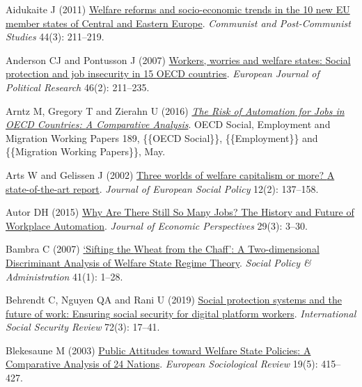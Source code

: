 \documentclass[
  12pt,
]{article}
\newlength{\cslhangindent}
\newenvironment{CSLReferences}[2] %
 {\begin{list}{}{%
  \setlength{\itemindent}{0pt}
  \setlength{\leftmargin}{0pt}
  \setlength{\parsep}{0pt}
  \ifodd #1
   \setlength{\leftmargin}{\cslhangindent}
   \setlength{\itemindent}{-1\cslhangindent}
  \fi
  \setlength{\itemsep}{#2\baselineskip}}}
 {\end{list}}
\begin{document}
\protect{}\label{refs}
\begin{CSLReferences}{1}{1}
Aidukaite J (2011)
\href{https://doi.org/10.1016/j.postcomstud.2011.07.005}{Welfare reforms
and socio-economic trends in the 10 new {EU} member states of {Central}
and {Eastern Europe}}. \emph{Communist and Post-Communist Studies}
44(3): 211--219.

Anderson CJ and Pontusson J (2007)
\href{https://doi.org/10.1111/j.1475-6765.2007.00692.x}{Workers, worries
and welfare states: {Social} protection and job insecurity in 15 {OECD}
countries}. \emph{European Journal of Political Research} 46(2):
211--235.

Arntz M, Gregory T and Zierahn U (2016)
\emph{\href{https://doi.org/10.1787/5jlz9h56dvq7-en}{The {Risk} of
{Automation} for {Jobs} in {OECD Countries}: {A Comparative Analysis}}}.
{OECD Social}, {Employment} and {Migration Working Papers} 189, \{\{OECD
Social\}\}, \{\{Employment\}\} and \{\{Migration Working Papers\}\},
May.

Arts W and Gelissen J (2002)
\href{https://doi.org/10.1177/0952872002012002114}{Three worlds of
welfare capitalism or more? {A} state-of-the-art report}. \emph{Journal
of European Social Policy} 12(2): 137--158.

Autor DH (2015) \href{https://doi.org/10.1257/jep.29.3.3}{Why {Are There
Still So Many Jobs}? {The History} and {Future} of {Workplace
Automation}}. \emph{Journal of Economic Perspectives} 29(3): 3--30.

Bambra C (2007)
\href{https://doi.org/10.1111/j.1467-9515.2007.00536.x}{{`{Sifting} the
{Wheat} from the {Chaff}'}: {A Two}-dimensional {Discriminant Analysis}
of {Welfare State Regime Theory}}. \emph{Social Policy \&
Administration} 41(1): 1--28.

Behrendt C, Nguyen QA and Rani U (2019)
\href{https://doi.org/10.1111/issr.12212}{Social protection systems and
the future of work: {Ensuring} social security for digital platform
workers}. \emph{International Social Security Review} 72(3): 17--41.

Blekesaune M (2003) \href{https://doi.org/10.1093/esr/19.5.415}{Public
{Attitudes} toward {Welfare State Policies}: {A Comparative Analysis} of
24 {Nations}}. \emph{European Sociological Review} 19(5): 415--427.


\end{CSLReferences}
\end{document}
